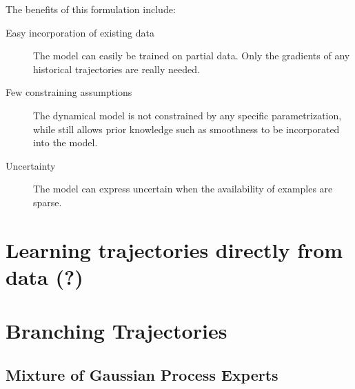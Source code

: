 The benefits of this formulation include:
\begin{description}
    \item[Easy incorporation of existing data] The model can easily be trained on partial data. Only the gradients of any historical trajectories are really needed.
    \item[Few constraining assumptions] The dynamical model is not constrained by any specific parametrization, while still allows prior knowledge such as smoothness to be incorporated into the model.
    \item[Uncertainty] The model can express uncertain when the availability of examples are sparse. 
\end{description}

\section{Learning trajectories directly from data (?)}
\section{Branching Trajectories}
\subsection{Mixture of Gaussian Process Experts}

